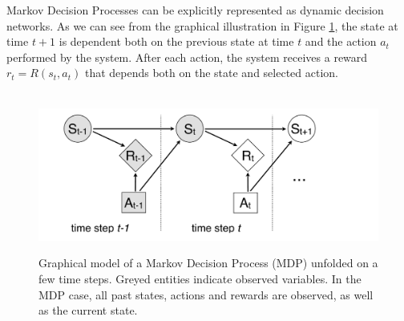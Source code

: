 Markov Decision Processes can be explicitly represented as dynamic decision networks.  As we can see from the graphical illustration in Figure \ref{fig:mdp}, the state at time $t+1$ is dependent both on the previous state at time $t$ and the action $a_t$ performed by the system. After each action, the system receives a reward $r_t = R(s_t, a_t)$ that depends both on the state and selected action. 

\begin{figure}[ht]
$\phantom{d}$\hspace{20mm}
\includegraphics[scale=0.25]{imgs/MDP.pdf}
\caption{Graphical model of a Markov Decision Process (MDP) unfolded on a few time steps.  Greyed entities indicate observed variables. In the MDP case, all past states, actions and rewards are observed, as well as the current state.}
\label{fig:mdp}
\end{figure}

